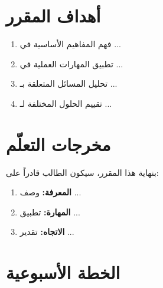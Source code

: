 \documentclass[11pt,a4paper]{article}
\begin{document}
\section{أهداف المقرر}
\label{sec:objectives}

\begin{enumerate}
    \item فهم المفاهيم الأساسية في ...
    \item تطبيق المهارات العملية في ...
    \item تحليل المسائل المتعلقة بـ ...
    \item تقييم الحلول المختلفة لـ ...
\end{enumerate}

\section{مخرجات التعلّم}
\label{sec:outcomes}

بنهاية هذا المقرر، سيكون الطالب قادراً على:
\begin{enumerate}
    \item \textbf{المعرفة:} وصف ...
    \item \textbf{المهارة:} تطبيق ...
    \item \textbf{الاتجاه:} تقدير ...
\end{enumerate}

\section{الخطة الأسبوعية}
\label{sec:schedule}
\end{document}
